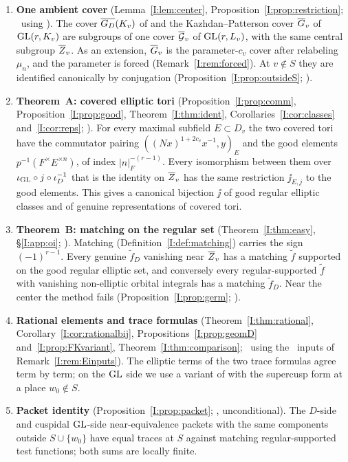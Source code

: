 \begin{enumerate}[leftmargin=*,label=\arabic*.]
\item \textbf{One ambient cover} (Lemma~\ref{I:lem:center}, Proposition~\ref{I:prop:restriction}; \Pv\ using \Ev). The cover $\overline{G_D}(K_v)$ of \cite{JC26a} and the Kazhdan--Patterson cover $\overline G_v$ of $\operatorname{GL}(r,K_v)$ are subgroups of one cover $\overline{\mathcal{G}}_v$ of $\operatorname{GL}(r,L_v)$, with the same central subgroup $\overline{Z}_v$. As an extension, $\overline G_v$ is the parameter-$c_v$ cover after relabeling $\mu_n$, and the parameter is forced (Remark~\ref{I:rem:forced}). At $v\notin S$ they are identified canonically by conjugation (Proposition~\ref{I:prop:outsideS}; \Pv).
\item \textbf{Theorem~A: covered elliptic tori} (Proposition~\ref{I:prop:comm}, Proposition~\ref{I:prop:good}, Theorem~\ref{I:thm:ident}, Corollaries~\ref{I:cor:classes} and~\ref{I:cor:reps}; \Pv). For every maximal subfield $E\subset D_v$ the two covered tori have the commutator pairing $((Nx)^{1+2c_v}x^{-1},y)_E$ and the good elements $p^{-1}(F^\times E^{\times n})$, of index $|n|_F^{-(r-1)}$. Every isomorphism between them over $\iota_{\operatorname{GL}}\circ j\circ\iota_D^{-1}$ that is the identity on $\overline{Z}_v$ has the same restriction $\jj_{E,j}$ to the good elements. This gives a canonical bijection $\jj$ of good regular elliptic classes and of genuine representations of covered tori.
\item \textbf{Theorem~B: matching on the regular set} (Theorem~\ref{I:thm:easy}, \S\ref{I:app:oi}; \Pv). Matching (Definition~\ref{I:def:matching}) carries the sign $(-1)^{r-1}$. Every genuine $\tilde f_D$ vanishing near $\overline{Z}_v$ has a matching $\tilde f$ supported on the good regular elliptic set, and conversely every regular-supported $\tilde f$ with vanishing non-elliptic orbital integrals has a matching $\tilde f_D$. Near the center the method fails (Proposition~\ref{I:prop:germ}; \Pv).
\item \textbf{Rational elements and trace formulas} (Theorem~\ref{I:thm:rational}, Corollary~\ref{I:cor:rationalbij}, Propositions~\ref{I:prop:geomD} and~\ref{I:prop:FKvariant}, Theorem~\ref{I:thm:comparison}; \Pv\ using the \Ev\ inputs of Remark~\ref{I:rem:Einputs}). The elliptic terms of the two trace formulas agree term by term; on the $\operatorname{GL}$ side we use a variant of \cite[\S18]{FK86} with the supercusp form at a place $w_0\notin S$.
\item \textbf{Packet identity} (Proposition~\ref{I:prop:packet}; \Pv, unconditional). The $D$-side and cuspidal $\operatorname{GL}$-side near-equivalence packets with the same components outside $S\cup\{w_0\}$ have equal traces at $S$ against matching regular-supported test functions; both sums are locally finite.

\end{enumerate}
